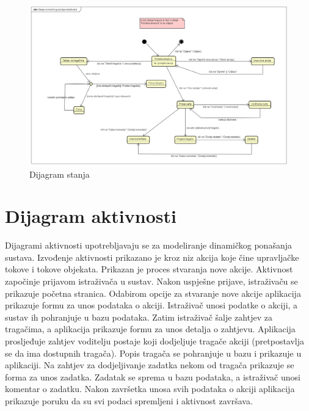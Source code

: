 			\begin{figure}[H]
				\includegraphics[scale=0.3]{dijagrami/DijStanja.png} 
				\centering
				\caption{Dijagram stanja}
				\label{fig:promjene}
			\end{figure}
			
			
			\eject 
		
		\section{Dijagram aktivnosti}
			
			Dijagrami aktivnosti upotrebljavaju se za modeliranje dinamičkog ponašanja sustava. Izvođenje aktivnosti prikazano je kroz niz akcija koje čine upravljačke tokove i tokove objekata. Prikazan je proces stvaranja nove akcije. Aktivnost započinje prijavom istraživača u sustav. Nakon uspješne prijave, istraživaču se prikazuje početna stranica. Odabirom opcije za stvaranje nove akcije aplikacija prikazuje formu za unos podataka o akciji. Istraživač unosi podatke o akciji, a sustav ih pohranjuje u bazu podataka. Zatim istraživač šalje zahtjev za tragačima, a aplikacija prikazuje formu za unos detalja o zahtjevu. Aplikacija prosljeđuje zahtjev voditelju postaje koji dodjeljuje tragače akciji (pretpostavlja se da ima dostupnih tragača). Popis tragača se pohranjuje u bazu i prikazuje u aplikaciji. Na zahtjev za dodjeljivanje zadatka nekom od tragača prikazuje se forma za unos zadatka. Zadatak se sprema u bazu podataka, a istraživač unosi komentar o zadatku. Nakon završetka unosa svih podataka o akciji aplikacija prikazuje poruku da su svi podaci spremljeni i aktivnost završava.
			

